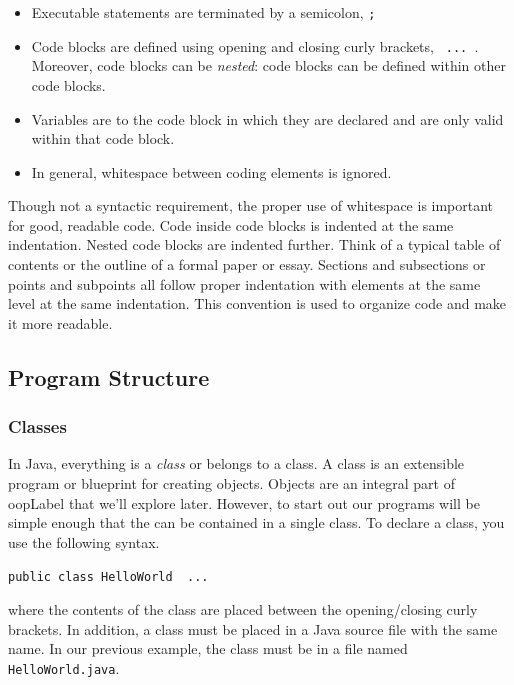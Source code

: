 \begin{itemize}
\begin{center}
	\end{center}
  \item Executable statements are terminated by a semicolon, \texttt{;}
  \item Code blocks are defined using opening and closing curly brackets, 
  	\texttt{{ ... }}.  Moreover, code blocks can be \emph{nested}: code
	blocks can be defined within other code blocks.  
  \item Variables are  to the code block in which they are declared
  	and are only valid within that code block.
  \item In general, whitespace between coding elements is ignored.
\end{itemize}

Though not a syntactic requirement, the proper use of whitespace is important for
good, readable code.  Code inside code blocks is indented at the same indentation.
Nested code blocks are indented further.  Think of a typical table of contents or
the outline of a formal paper or essay.  Sections and subsections or points and 
subpoints all follow proper indentation with elements at the same level at the same
indentation.  This convention is used to organize code and make it more readable.

\subsection{Program Structure}

\subsubsection{Classes}

In Java, everything is a \emph{class} or belongs to a class.  A class is an 
extensible program or blueprint for creating objects.  Objects are an integral
part of \gls{oopLabel} that we'll explore later.  However, to start out our
programs will be simple enough that the can be contained in a single class.
To declare a class, you use the following syntax.

\texttt{public class HelloWorld { ... }}

where the contents of the class are placed between the opening/closing curly
brackets.  In addition, a class must be placed in a Java source file with the same
name.  In our previous example, the class must be in a file named 
\texttt{HelloWorld.java}.  

